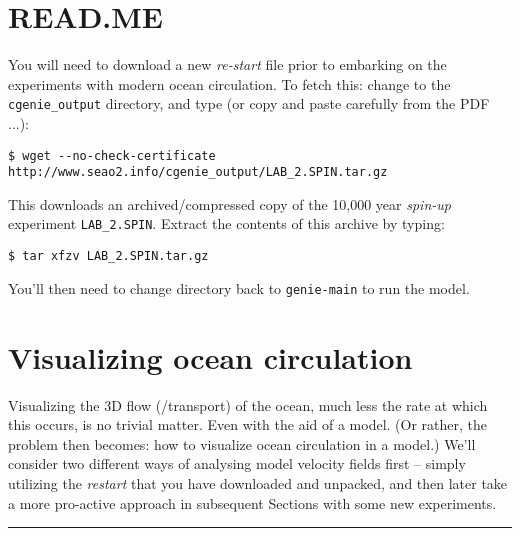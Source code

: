 \newpage

\section*{READ.ME}

You will need to download a new \textit{re-start} file prior to embarking on the experiments with modern ocean circulation.
To fetch this: change to the \texttt{cgenie\_output} directory, and type (or copy and paste carefully from the PDF ...):

\vspace{-2mm}
\small\begin{verbatim}
$ wget --no-check-certificate http://www.seao2.info/cgenie_output/LAB_2.SPIN.tar.gz
\end{verbatim}\normalsize
\vspace{-2mm}

This downloads an archived/compressed copy of the 10,000 year \textit{spin-up} experiment \texttt{LAB\_2.SPIN}. Extract the contents of this archive by typing:

\vspace{-2mm}
\begin{verbatim}
$ tar xfzv LAB_2.SPIN.tar.gz
\end{verbatim}
\vspace{-2mm}

You’ll then need to change directory back to \texttt{genie-main} to run the model.

\newpage

\section{Visualizing ocean circulation}

Visualizing the 3D flow (/transport) of the ocean, much less the rate at which this occurs, is no trivial matter. Even with the aid of a model. (Or rather, the problem then becomes: how to visualize ocean circulation in a model.) We'll consider two different ways of analysing model velocity fields first -- simply utilizing the \textit{restart} that you have downloaded and unpacked, and then later take a more pro-active approach in subsequent Sections with some new experiments.

\vspace{1mm}
\noindent\rule{4cm}{0.5pt}
\vspace{2mm}

